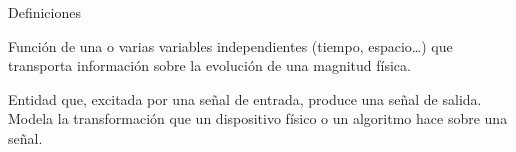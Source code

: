 \documentclass[aspectratio=169,11pt]{beamer}
\begin{document}
\begin{frame}{Definiciones}
  \begin{center}
  \end{center}
  \begin{definicion}[Señal]
    Función de una o varias variables independientes (tiempo, espacio\ldots) que transporta información sobre la evolución de una magnitud física.
  \end{definicion}
  \begin{definicion}[Sistema]
    Entidad que, excitada por una señal de entrada, produce una señal de salida. Modela la transformación que un dispositivo físico o un algoritmo hace sobre una señal.
  \end{definicion}
\end{frame}
\end{document}

